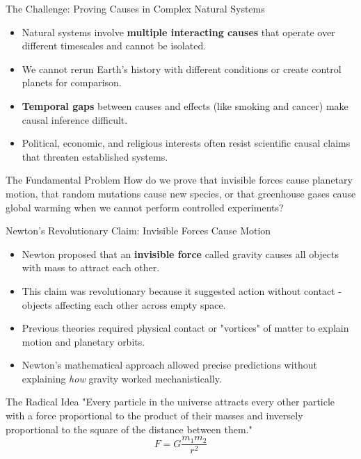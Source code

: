 \documentclass{beamer}
\begin{document}
	\begin{frame}{The Challenge: Proving Causes in Complex Natural Systems}
		\begin{itemize}
			\item Natural systems involve \textbf{multiple interacting causes} that operate over different timescales and cannot be isolated.
			\item We cannot rerun Earth's history with different conditions or create control planets for comparison.
			\item \textbf{Temporal gaps} between causes and effects (like smoking and cancer) make causal inference difficult.
			\item Political, economic, and religious interests often resist scientific causal claims that threaten established systems.
		\end{itemize}
		
		\begin{alertblock}{The Fundamental Problem}
			How do we prove that invisible forces cause planetary motion, that random mutations cause new species, or that greenhouse gases cause global warming when we cannot perform controlled experiments?
		\end{alertblock}
	\end{frame}
	
	\begin{frame}{Newton's Revolutionary Claim: Invisible Forces Cause Motion}
		\begin{itemize}
			\item Newton proposed that an \textbf{invisible force} called gravity causes all objects with mass to attract each other.
			\item This claim was revolutionary because it suggested action without contact - objects affecting each other across empty space.
			\item Previous theories required physical contact or "vortices" of matter to explain motion and planetary orbits.
			\item Newton's mathematical approach allowed precise predictions without explaining \textit{how} gravity worked mechanistically.
		\end{itemize}
		
		\begin{block}{The Radical Idea}
			"Every particle in the universe attracts every other particle with a force proportional to the product of their masses and inversely proportional to the square of the distance between them."
			\[F = G\frac{m_1 m_2}{r^2}\]
		\end{block}
	\end{frame}
	
\end{document}
